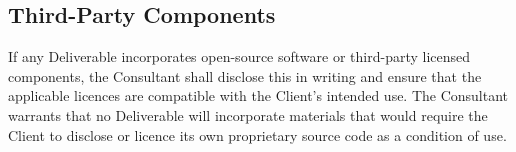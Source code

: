 \subsection{Third-Party Components}

If any Deliverable incorporates open-source software or third-party licensed components,
the Consultant shall disclose this in writing and ensure that the applicable licences are
compatible with the Client's intended use. The Consultant warrants that no Deliverable
will incorporate materials that would require the Client to disclose or licence its own
proprietary source code as a condition of use.
